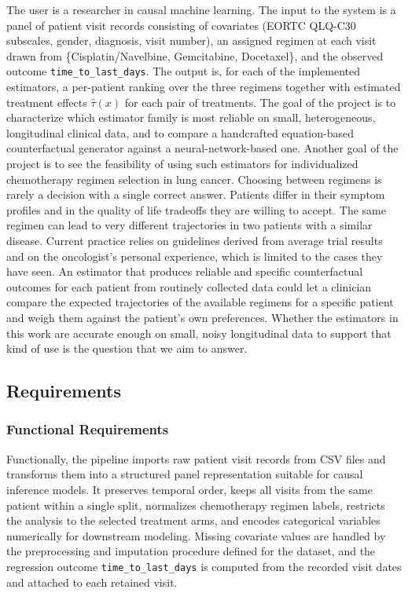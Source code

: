\documentclass{article}
\begin{document}
The user is a researcher in causal machine learning. The input to the
system is a panel of patient visit records consisting of covariates
(EORTC QLQ-C30 subscales, gender, diagnosis, visit number), an assigned
regimen at each visit drawn from \{Cisplatin/Navelbine, Gemcitabine,
Docetaxel\}, and the observed outcome \texttt{time\_to\_last\_days}.
The output is, for each of the implemented estimators, a per-patient
ranking over the three regimens together with estimated treatment
effects $\hat{\tau}(x)$ for each pair of treatments.
\newline
The goal of the project is to characterize which
estimator family is most reliable on small, heterogeneous, longitudinal
clinical data, and to compare a handcrafted equation-based
counterfactual generator against a neural-network-based one.
\newline
Another goal of the project is to see the feasibility of using such
estimators for individualized chemotherapy regimen selection in lung
cancer. Choosing between regimens is rarely a decision with a single
correct answer. Patients differ in their symptom profiles and in the quality of life tradeoffs they
are willing to accept. The same regimen can lead to very different
trajectories in two patients with a similar disease. Current practice
relies on guidelines derived from average trial results and on the 
oncologist's personal experience, which is limited to the cases they
have seen. An estimator that produces reliable and specific
counterfactual outcomes for each patient from routinely collected data could let a
clinician compare the expected trajectories of the available regimens
for a specific patient and weigh them against the patient's own
preferences. Whether the estimators in this work are accurate enough on
small, noisy longitudinal data to support that kind of use is the
question that we aim to answer.

\subsection{Requirements}

\subsubsection{Functional Requirements}
Functionally, the pipeline imports raw patient visit records from CSV files and transforms them into a structured panel representation suitable for causal inference models. It preserves temporal order, keeps all visits from the same patient within a single split, normalizes chemotherapy regimen labels, restricts the analysis to the selected treatment arms, and encodes categorical variables numerically for downstream modeling. Missing covariate values are handled by the preprocessing and imputation procedure defined for the dataset, and the regression outcome \texttt{time\_to\_last\_days} is computed from the recorded visit dates and attached to each retained visit.
\end{document}
